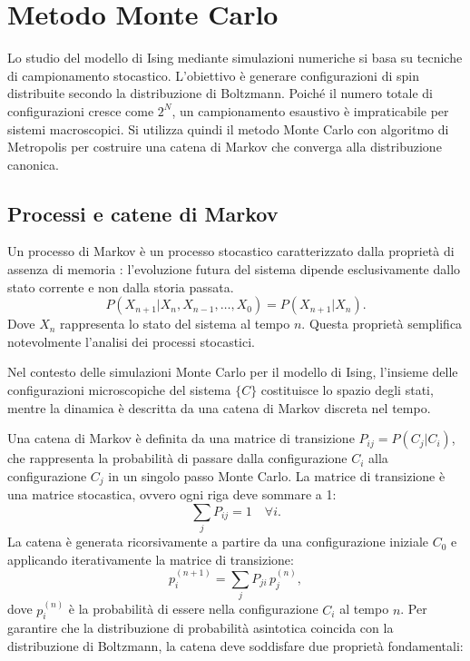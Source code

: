 \section{Metodo Monte Carlo}

Lo studio del modello di Ising mediante simulazioni numeriche si basa su tecniche 
di campionamento stocastico. L'obiettivo è generare configurazioni di spin distribuite 
secondo la distribuzione di Boltzmann. Poiché il numero totale di configurazioni cresce 
come $2^N$, un campionamento esaustivo è impraticabile per sistemi macroscopici. 
Si utilizza quindi il metodo Monte Carlo con algoritmo di Metropolis per costruire una 
catena di Markov che converga alla distribuzione canonica.

\subsection{Processi e catene di Markov}

Un processo di Markov è un processo stocastico caratterizzato dalla proprietà di assenza 
di memoria \cite{quantum_mc}: l'evoluzione futura del sistema dipende esclusivamente dallo 
stato corrente e non dalla storia passata.
\begin{equation}
P(X_{n+1} | X_n, X_{n-1}, \ldots, X_0) = P(X_{n+1} | X_n).
\end{equation}
Dove $X_n$ rappresenta lo stato del sistema al tempo $n$. Questa proprietà semplifica 
notevolmente l'analisi dei processi stocastici.

Nel contesto delle simulazioni Monte Carlo per il modello di Ising, l'insieme delle 
configurazioni microscopiche del sistema $\{C\}$ costituisce lo spazio degli stati, 
mentre la dinamica è descritta da una catena di Markov discreta nel tempo.

Una catena di Markov è definita da una matrice di transizione $P_{ij} = P(C_j|C_i)$, 
che rappresenta la probabilità di passare dalla configurazione $C_i$ alla configurazione 
$C_j$ in un singolo passo Monte Carlo. La matrice di transizione è una matrice stocastica, 
ovvero ogni riga deve sommare a 1:
\begin{equation}
\sum_{j} P_{ij} = 1 \quad \forall i.
\end{equation}
La catena è generata ricorsivamente a partire da una configurazione iniziale $C_0$ e 
applicando iterativamente la matrice di transizione:
\begin{equation}
    p_i^{(n+1)} = \sum_{j} P_{ji}\, p_j^{(n)},
\end{equation}
dove $p_i^{(n)}$ è la probabilità di essere nella configurazione $C_i$ al tempo $n$.
Per garantire che la distribuzione di probabilità asintotica coincida con la distribuzione 
di Boltzmann, la catena deve soddisfare due proprietà fondamentali:

